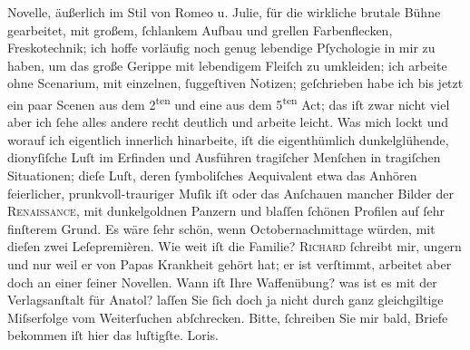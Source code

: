 \begin{ledgroupsized}[t]{13cm}
               Novelle, äußerlich im Stil von Romeo u. Julie, für
               die wirkliche brutale Bühne gearbeitet, mit {\pb}großem, ſchlankem Aufbau und
               grellen Farbenflecken, Freskotechnik; ich hoffe vorläufig noch genug lebendige
               Pſychologie in mir zu haben, um das große Gerippe mit lebendigem Fleiſch zu
               umkleiden; ich arbeite ohne Scenarium, mit einzelnen, ſuggeſtiven Notizen;
               geſchrieben habe ich bis jetzt ein paar Scenen aus dem 2\textsuperscript{ten} und eine aus dem 5\textsuperscript{ten} Act; das iſt zwar
               nicht viel aber ich ſehe alles andere recht deutlich und arbeite leicht. Was mich
               lockt und worauf ich eigentlich innerlich hinarbeite, iſt die eigenthümlich
               dunkelglühende, dionyſiſche Luſt im Erfinden und Ausführen tragiſcher Menſchen in
               tragiſchen Situationen; dieſe Luſt, deren ſymboliſches Aequivalent etwa das Anhören
                  {\pb}feierlicher,
               prunkvoll-trauriger Muſik iſt oder das Anſchauen mancher Bilder der \textsc{Renaissance}, mit dunkelgoldnen Panzern und blaſſen ſchönen
               Profilen auf ſehr finſterem Grund. Es wäre ſehr schön, wenn Octobernachmittage
               würden, mit dieſen zwei Leſepremièren. Wie weit iſt die Familie? \hspace*{2em}\textsc{Richard}{ }ſchreibt mir, ungern und nur weil er von Papas Krankheit gehört hat; er
               ist verſtimmt, arbeitet aber doch an einer ſeiner Novellen. Wann iſt Ihre Waffenübung? was ist es mit der
               Verlagsanſtalt für Anatol? laſſen Sie ſich doch ja
               nicht durch ganz gleichgiltige Miſserfolge vom Weiterſuchen abſchrecken. Bitte,
               ſchreiben Sie mir bald, Briefe bekommen iſt hier das luſtigſte.\pend
           \pstart \spacefill\mbox{Loris.}\pend{}
         
         \endnumbering{}\end{ledgroupsized}  \newcommand{\dateiname}{L00105}\newcommand{\titel}{Hugo von Hofmannsthal an Arthur Schnitzler, 19. 7. [1892]}\newcommand{\editorInnen}{ Martin Anton Müller und Gerd-Hermann Susen}
      